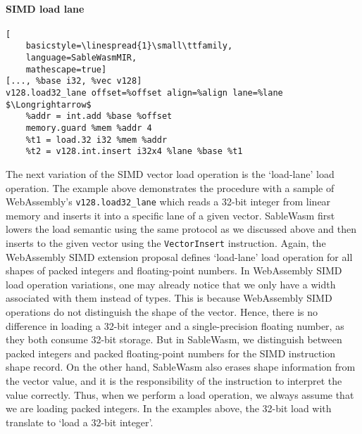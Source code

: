 \paragraph{SIMD load lane} \quad
\begin{lstlisting}[
    basicstyle=\linespread{1}\small\ttfamily, 
    language=SableWasmMIR, 
    mathescape=true]
[..., %base i32, %vec v128]
v128.load32_lane offset=%offset align=%align lane=%lane $\Longrightarrow$
    %addr = int.add %base %offset
    memory.guard %mem %addr 4
    %t1 = load.32 i32 %mem %addr
    %t2 = v128.int.insert i32x4 %lane %base %t1
\end{lstlisting}
The next variation of the SIMD vector load operation is the `load-lane' load
operation. The example above demonstrates the procedure with a sample of
WebAssembly's \texttt{v128.load32\_lane} which reads a 32-bit integer from
linear memory and inserts it into a specific lane of a given vector. SableWasm
first lowers the load semantic using the same protocol as we discussed above and
then inserts to the given vector using the \texttt{VectorInsert} instruction.
Again, the WebAssembly SIMD extension proposal defines `load-lane' load
operation for all shapes of packed integers and floating-point numbers. In
WebAssembly SIMD load operation variations, one may already notice that we only
have a width associated with them instead of types. This is because WebAssembly
SIMD operations do not distinguish the shape of the vector. Hence, there is no
difference in loading a 32-bit integer and a single-precision floating number,
as they both consume 32-bit storage. But in SableWasm, we distinguish between
packed integers and packed floating-point numbers for the SIMD instruction shape
record. On the other hand, SableWasm also erases shape information from the
vector value, and it is the responsibility of the instruction to interpret the
value correctly. Thus, when we perform a load operation, we always assume that
we are loading packed integers. In the examples above, the 32-bit load with
translate to `load a 32-bit integer'.

